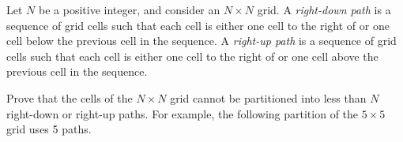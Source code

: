 Let $N$ be a positive integer, and consider an $N \times N$ grid. A \emph{right-down path} is a sequence of grid cells such that each cell is either one cell to the right of or one cell below the previous cell in the sequence. A \emph{right-up path} is a sequence of grid cells such that each cell is either one cell to the right of or one cell above the previous cell in the sequence.

Prove that the cells of the $N \times N$ grid cannot be partitioned into less than $N$ right-down or right-up paths. For example, the following partition of the $5 \times 5$ grid uses 5 paths.
